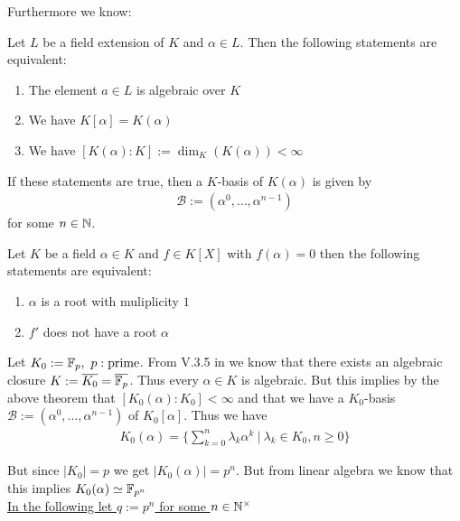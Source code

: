 \documentclass[]{article}
\begin{document}
Furthermore we know:

\begin{theorem*}
    Let \(L\) be a field extension of \(K\) and \(\alpha \in L\). Then the following statements are equivalent:
    \begin{enumerate}
        \item The element \(a \in L\) is algebraic over \(K\)
        \item We have \(K[\alpha]=K(\alpha)\)
        \item We have \([K(\alpha):K]:=\dim_K(K(\alpha)) < \infty\)
    \end{enumerate}
    If these statements are true, then a \(K\)-basis of \(K(\alpha)\) is given by 
    \begin{align*}
        \mathscr{B}:=(\alpha^0, \dots, \alpha^{n-1})
    \end{align*}
    for some \(n \in {\mathbb{N}}\).
\end{theorem*}

\begin{theorem*}
    Let \(K\) be a field \(\alpha \in K\) and \(f \in K[X]\) with \(f(\alpha)=0\) then the following statements are equivalent:
    \begin{enumerate}
        \item \(\alpha\) is a root with muliplicity \(1\)
        \item \(f'\) does not have a root \(\alpha\)
    \end{enumerate}
\end{theorem*}

Let \(K_0:= {\mathbb{F}}_p, \ p:\text{prime}\). 
From V.3.5 in \cite{jan} we know that there exists an algebraic closure \(K:=\overline{K_0}=\overline{{\mathbb{F}}_p}\). 
Thus every \(\alpha \in K\) is algebraic. But this implies by the above theorem that \([K_0(\alpha):K_0]< \infty\)
and that we have a \(K_0\)-basis \(\mathscr{B}:=(\alpha^0, \dots, \alpha^{n-1})\) of \(K_0[\alpha]\). Thus we have
\begin{align*}
    K_0(\alpha)=\{\sum_{k=0}^{n}\lambda_k \alpha^k \ | \ \lambda_k \in K_0, n \geq 0\}
\end{align*}

But since \(|K_0|=p\) we get \(|K_0(\alpha)|=p^n\). But from linear algebra we know that this implies 
\(K_0(\alpha) \simeq  {\mathbb{F}}_{p^n}\) \\

\underline{In the following let \(q:= p^n\) for some \(n \in {\mathbb{N}}^\times\) }
\end{document}
